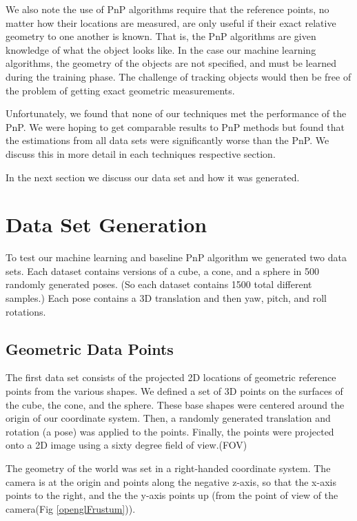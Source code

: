 \documentclass[journal]{IEEEtran}
\begin{document}
 We also note the use of PnP algorithms require that the reference points, no matter how their locations are measured, are only useful if their exact relative geometry to one another is known. That is, the PnP algorithms are given knowledge of what the object looks like. In the case our machine learning algorithms, the geometry of the objects are not specified, and must be learned during the training phase. The challenge of tracking objects would then be free of the problem of getting exact geometric measurements.
 
Unfortunately, we found that none of our techniques met the performance of the PnP.  We were hoping to get comparable results to PnP methods but found that the estimations from all data sets were significantly worse than the PnP. We discuss this in more detail in each techniques respective section.

In the next section we discuss our data set and how it was generated. 


\section{Data Set Generation}

To test our machine learning and baseline PnP algorithm we generated two data sets. Each dataset contains versions of a cube, a cone, and a sphere in 500 randomly generated poses. (So each dataset contains 1500 total different samples.) Each pose contains a 3D translation and then yaw, pitch, and roll rotations.

\subsection{Geometric Data Points}

The first data set consists of the projected 2D locations of geometric reference points from the various shapes. We defined a set of 3D points on the surfaces of the cube, the cone, and the sphere. These base shapes were centered around the origin of our coordinate system. Then, a randomly generated translation and rotation (a pose) was applied to the points. Finally, the points were projected onto a 2D image using a sixty degree field of view.(FOV)

The geometry of the world was set in a right-handed coordinate system. The camera is at the origin and points along the negative z-axis, so that the x-axis points to the right, and the the y-axis points up (from the point of view of the camera(Fig \ref{openglFrustum})).
\end{document}
